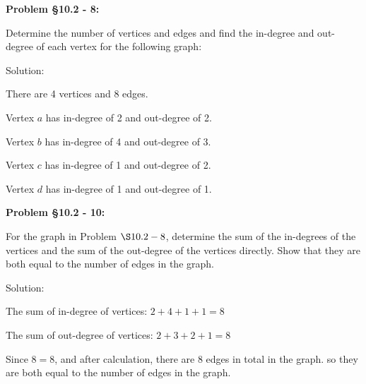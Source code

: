 \documentclass{article}
\newenvironment{problem}[1]
{\begin{mdframed}[default]
\textbf{Problem #1:}
}
{\end{mdframed}
}
\begin{document}
\begin{problem}{\S 10.2 - 8}
Determine the number of vertices and edges and find the in-degree and out-degree of
each vertex for the following graph:
\begin{center}
\end{center}
Solution:

There are 4 vertices and 8 edges. 

Vertex $a$ has in-degree of 2 and out-degree of 2. 

Vertex $b$ has in-degree of 4 and out-degree of 3.

Vertex $c$ has in-degree of 1 and out-degree of 2. 

Vertex $d$ has in-degree of 1 and out-degree of 1. 
\end{problem}
\begin{problem}{\S 10.2 - 10}
For the graph in Problem $\S 10.2 - 8$, determine the sum of the in-degrees of the
vertices and the sum of the out-degree of the vertices directly. Show that they are
both equal to the number of edges in the graph.

Solution:

The sum of in-degree of vertices: $2+4+1+1=8$

The sum of out-degree of vertices: $2+3+2+1=8$

Since $8=8$, and after calculation, there are 8 edges in total in the graph. so they are both equal to the number of edges in the graph.
\end{problem}
\end{document}
